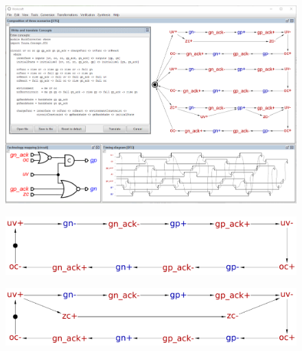 \documentclass[british, journal]{IEEEtran}
\begin{document}
\begin{figure}[H]
	\begin{centering}
		\includegraphics[scale=0.51]{Images/design_flow_wc_screenshot}
		\par\end{centering}
	
	\vspace{-4mm}
\end{figure}

\begin{figure}[H]
	\begin{centering}
		\includegraphics[scale=0.23]{Images/stg-UV_without_ZC}
		\par\end{centering}
	\vspace{-4mm}
\end{figure}

\begin{figure}[H]
	\begin{centering}
		\includegraphics[scale=0.23]{Images/stg-UV_before_ZC}
		\par\end{centering}
	\vspace{-4mm}
\end{figure}
\end{document}
